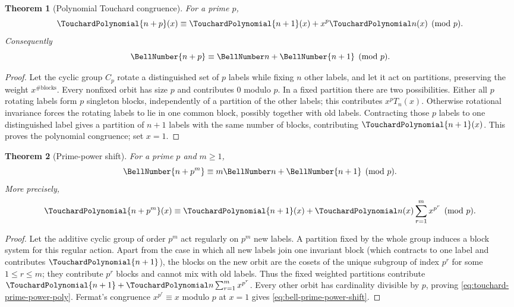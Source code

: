 \documentclass[11pt,a4paper,oneside,openany]{book}
\newtheorem{theorem}{Theorem}[chapter]
\theoremstyle{definition}
\theoremstyle{remark}
\begin{document}
\begin{theorem}[Polynomial Touchard congruence]\label{thm:touchard-poly}
For a prime $p$,
\begin{equation}\label{eq:touchard-poly}
 \TouchardPolynomial{n+p}(x)\equiv \TouchardPolynomial{n+1}(x)+x^p\TouchardPolynomial n(x)\pmod p.
\end{equation}
Consequently
\begin{equation}\label{eq:touchard}
 \BellNumber{n+p}\equiv\BellNumber n+\BellNumber{n+1}\pmod p.
\end{equation}
\end{theorem}
\begin{proof}
Let the cyclic group $C_p$ rotate a distinguished set of $p$ labels while fixing
$n$ other labels, and let it act on partitions, preserving the weight $x^{\#\text{
blocks}}$.  Every nonfixed orbit has size $p$ and contributes $0$ modulo $p$.
In a fixed partition there are two possibilities.  Either all $p$ rotating labels
form $p$ singleton blocks, independently of a partition of the other labels; this
contributes $x^pT_n(x)$.  Otherwise rotational invariance forces the rotating labels
to lie in one common block, possibly together with old labels.  Contracting those
$p$ labels to one distinguished label gives a partition of $n+1$ labels with the
same number of blocks, contributing $\TouchardPolynomial{n+1}(x)$.  This proves the polynomial
congruence; set $x=1$.
\end{proof}

\begin{theorem}[Prime-power shift]\label{thm:bell-prime-power-shift}
For a prime $p$ and $m\ge1$,
\begin{equation}\label{eq:bell-prime-power-shift}
 \BellNumber{n+p^m}\equiv m\BellNumber n+\BellNumber{n+1}\pmod p.
\end{equation}
More precisely,
\begin{equation}\label{eq:touchard-prime-power-poly}
 \TouchardPolynomial{n+p^m}(x)\equiv \TouchardPolynomial{n+1}(x)+\TouchardPolynomial n(x)\sum_{r=1}^{m}x^{p^r}
 \pmod p.
\end{equation}
\end{theorem}
\begin{proof}
Let the additive cyclic group of order $p^m$ act regularly on $p^m$ new labels.
A partition fixed by the whole group induces a block system for this regular
action.  Apart from the case in which all new labels join one invariant block
(which contracts to one label and contributes $\TouchardPolynomial{n+1}$), the blocks on the new
orbit are the cosets of the unique subgroup of index $p^r$ for some
$1\le r\le m$; they contribute $p^r$ blocks and cannot mix with old labels.
Thus the fixed weighted partitions contribute
$\TouchardPolynomial{n+1}+\TouchardPolynomial n\sum_{r=1}^m x^{p^r}$.  Every other orbit has cardinality divisible by
$p$, proving \eqref{eq:touchard-prime-power-poly}.  Fermat's congruence
$x^{p^r}\equiv x$ modulo $p$ at $x=1$ gives
\eqref{eq:bell-prime-power-shift}.
\end{proof}
\end{document}
